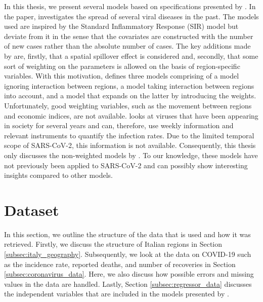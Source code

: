 \documentclass[12pt]{article}
\begin{document}
	In this thesis, we present several models based on specifications presented by \textcite{adda2016economic}. In the paper, \textcite{adda2016economic} investigates the spread of several viral diseases in the past. The models used are inspired by the Standard Inflammatory Response (SIR) model but deviate from it in the sense that the covariates are constructed with the number of new cases rather than the absolute number of cases. The key additions made by \textcite{adda2016economic} are, firstly, that a spatial spillover effect is considered and, secondly, that some sort of weighting on the parameters is allowed on the basis of region-specific variables. With this motivation, \textcite{adda2016economic} defines three models comprising of a model ignoring interaction between regions, a model taking interaction between regions into account, and a model that expands on the latter by introducing the weights. Unfortunately, good weighting variables, such as the movement between regions and economic indices, are not available. \textcite{adda2016economic} looks at viruses that have been appearing in society for several years and can, therefore, use weekly information and relevant instruments to quantify the infection rates. Due to the limited temporal scope of SARS-CoV-2, this information is not available. Consequently, this thesis only discusses the non-weighted models by \textcite{adda2016economic}. To our knowledge, these models have not previously been applied to SARS-CoV-2 and can possibly show interesting insights compared to other models.
	
	\section{Dataset} \label{sec:dataset}
	In this section, we outline the structure of the data that is used and how it was retrieved. Firstly, we discuss the structure of Italian regions in Section \ref{subsec:italy_geography}. Subsequently, we look at the data on COVID-19 such as the incidence rate, reported deaths, and number of recoveries in Section \ref{subsec:coronavirus_data}. Here, we also discuss how possible errors and missing values in the data are handled. Lastly, Section \ref{subsec:regressor_data} discusses the independent variables that are included in the models presented by \textcite{adda2016economic}.
	
	\newpage
\end{document}
